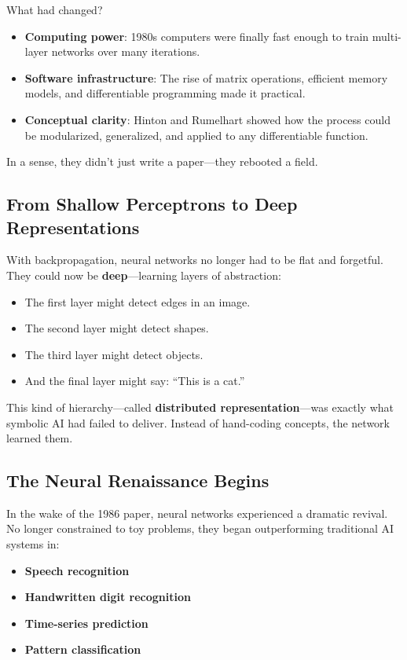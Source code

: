 What had changed?

\begin{itemize}
  \item \textbf{Computing power}: 1980s computers were finally fast enough to train multi-layer networks over many iterations.
  \item \textbf{Software infrastructure}: The rise of matrix operations, efficient memory models, and differentiable programming made it practical.
  \item \textbf{Conceptual clarity}: Hinton and Rumelhart showed how the process could be modularized, generalized, and applied to any differentiable function.
\end{itemize}

In a sense, they didn’t just write a paper—they rebooted a field.

\subsection{From Shallow Perceptrons to Deep Representations}

With backpropagation, neural networks no longer had to be flat and forgetful. They could now be \textbf{deep}—learning layers of abstraction:

\begin{itemize}
  \item The first layer might detect edges in an image.
  \item The second layer might detect shapes.
  \item The third layer might detect objects.
  \item And the final layer might say: “This is a cat.”
\end{itemize}

This kind of hierarchy—called \textbf{distributed representation}—was exactly what symbolic AI had failed to deliver. Instead of hand-coding concepts, the network learned them.

\subsection{The Neural Renaissance Begins}

In the wake of the 1986 paper, neural networks experienced a dramatic revival. No longer constrained to toy problems, they began outperforming traditional AI systems in:

\begin{itemize}
  \item \textbf{Speech recognition}
  \item \textbf{Handwritten digit recognition}
  \item \textbf{Time-series prediction}
  \item \textbf{Pattern classification}
\end{itemize}

